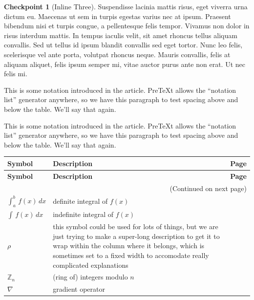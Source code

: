 \documentclass{amsart}
\theoremstyle{plain}%
\theoremstyle{definition}%
\newtheorem{inlineexercise}[theorem]{Checkpoint}
\theoremstyle{remark}%
\numberwithin{equation}{section}
\begin{document}
\begin{inlineexercise}[Inline Three]\label{exercise-duplicate-inline}%
%
Suspendisse lacinia mattis risus, eget viverra urna dictum eu. Maecenas ut sem in turpis egestas varius nec at ipsum. Praesent bibendum nisi et turpis congue, a pellentesque felis tempor. Vivamus non dolor in risus interdum mattis. In tempus iaculis velit, sit amet rhoncus tellus aliquam convallis. Sed ut tellus id ipsum blandit convallis sed eget tortor. Nunc leo felis, scelerisque vel ante porta, volutpat rhoncus neque. Mauris convallis, felis at aliquam aliquet, felis ipsum semper mi, vitae auctor purus ante non erat. Ut nec felis mi.%
\end{inlineexercise}%
%
%
%
\typeout{************************************************}
\typeout{************************************************}
%
\label{appendix-notation}%
This is some notation introduced in the article.  PreTeXt allows the ``notation list'' generator anywhere, so we have this paragraph to test spacing above and below the table.  We'll say that again.%
\par
This is some notation introduced in the article.  PreTeXt allows the ``notation list'' generator anywhere, so we have this paragraph to test spacing above and below the table.  We'll say that again.%
\begin{longtable}[l]{lp{}r}
\addtocounter{table}{-1}
\textbf{Symbol}&\textbf{Description}&\textbf{Page}\\[1em]
\endfirsthead
\textbf{Symbol}&\textbf{Description}&\textbf{Page}\\[1em]
\endhead
\multicolumn{3}{r}{(Continued on next page)}\\
\endfoot
\endlastfoot
\(\int_a^b\,f(x)\,dx\)&definite integral of \(f(x)\)&\pageref{section-introduction-2-5}\\
\(\int\,f(x)\,dx\)&indefinite integral of \(f(x)\)&\pageref{definition-indefinite-integral-3}\\
\(\rho\)&this symbol could be used for lots of things, but we are just trying to make a super-long description to get it to wrap within the column where it belongs, which is sometimes set to a fixed width to accomodate really complicated explanations&\pageref{derivatives-9-2-3}\\
\(\mathbb{Z}_n\)&(ring of) integers modulo \(n\)&\pageref{derivatives-9-2-11}\\
\(\nabla\)&gradient operator&\pageref{section-mathematics-3-3-3}\\
\end{longtable}
\end{document}

